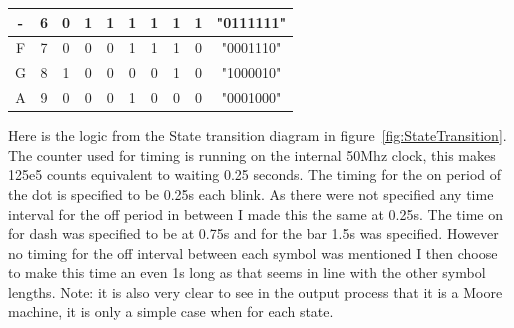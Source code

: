 \documentclass{article}
\begin{document}
\begin{table}[htbp]
\begin{tabular}{|c|c|c|c|c|c|c|c|c|c|}
    \hline
    -     & \cellcolor[rgb]{ .851,  .851,  .851}6 & \cellcolor[rgb]{ .71,  .902,  .635}0 & \cellcolor[rgb]{ .71,  .902,  .635}1 & \cellcolor[rgb]{ .71,  .902,  .635}1 & \cellcolor[rgb]{ .71,  .902,  .635}1 & \cellcolor[rgb]{ .71,  .902,  .635}1 & \cellcolor[rgb]{ .71,  .902,  .635}1 & \cellcolor[rgb]{ .71,  .902,  .635}1 & \cellcolor[rgb]{ .58,  .863,  .973}"0111111" \bigstrut\\
    \hline
    F     & \cellcolor[rgb]{ .851,  .851,  .851}7 & \cellcolor[rgb]{ .71,  .902,  .635}0 & \cellcolor[rgb]{ .71,  .902,  .635}0 & \cellcolor[rgb]{ .71,  .902,  .635}0 & \cellcolor[rgb]{ .71,  .902,  .635}1 & \cellcolor[rgb]{ .71,  .902,  .635}1 & \cellcolor[rgb]{ .71,  .902,  .635}1 & \cellcolor[rgb]{ .71,  .902,  .635}0 & \cellcolor[rgb]{ .58,  .863,  .973}"0001110" \bigstrut\\
    \hline
    G     & \cellcolor[rgb]{ .851,  .851,  .851}8 & \cellcolor[rgb]{ .71,  .902,  .635}1 & \cellcolor[rgb]{ .71,  .902,  .635}0 & \cellcolor[rgb]{ .71,  .902,  .635}0 & \cellcolor[rgb]{ .71,  .902,  .635}0 & \cellcolor[rgb]{ .71,  .902,  .635}0 & \cellcolor[rgb]{ .71,  .902,  .635}1 & \cellcolor[rgb]{ .71,  .902,  .635}0 & \cellcolor[rgb]{ .58,  .863,  .973}"1000010" \bigstrut\\
    \hline
    A     & \cellcolor[rgb]{ .851,  .851,  .851}9 & \cellcolor[rgb]{ .71,  .902,  .635}0 & \cellcolor[rgb]{ .71,  .902,  .635}0 & \cellcolor[rgb]{ .71,  .902,  .635}0 & \cellcolor[rgb]{ .71,  .902,  .635}1 & \cellcolor[rgb]{ .71,  .902,  .635}0 & \cellcolor[rgb]{ .71,  .902,  .635}0 & \cellcolor[rgb]{ .71,  .902,  .635}0 & \cellcolor[rgb]{ .58,  .863,  .973}"0001000" \bigstrut\\
    \hline
    \end{tabular}%
  \label{tab:7seg}%
\end{table}%

\clearpage
{}
Here is the logic from the State transition diagram in figure~\ref{fig:StateTransition}. The counter used for timing is running on the internal 50Mhz clock, this makes 125e5 counts equivalent to waiting 0.25 seconds. The timing for the on period of the dot is specified to be 0.25s each blink. As there were not specified any time interval for the off period in between I made this the same at 0.25s. The time on for dash was specified to be at 0.75s and for the bar 1.5s was specified. However no timing for the off interval between each symbol was mentioned I then choose to make this time an even 1s long as that seems in line with the other symbol lengths. Note: it is also very clear to see in the output process that it is a Moore machine, it is only a simple case when for each state.
\end{document}
